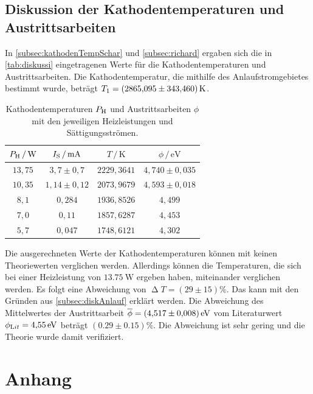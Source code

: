 \subsection{Diskussion der Kathodentemperaturen und Austrittsarbeiten}
\label{subsec:diskTemps}

In \autoref{subsec:kathodenTempSchar} und \autoref{subsec:richard} ergaben sich die in \autoref{tab:diskussi} eingetragenen Werte für die Kathodentemperaturen und Austrittsarbeiten.
Die Kathodentemperatur, die mithilfe des Anlaufstromgebietes bestimmt wurde, beträgt $T_1 = \SI{2865,095 \pm 343,460}{\kelvin}$.
\begin{table}[H]
    \caption{Kathodentemperaturen $P_{\text H}$ und Austrittsarbeiten $\phi$ mit den jeweiligen Heizleistungen und Sättigungsströmen.}
    \label{tab:diskussi}
    \centering
    \begin{tabular}{c c c c}
        \toprule
        $P_{\text H} \,/\, \si{\watt}$ & $I_{\text S} \,/\, \si{\milli\ampere}$ & $T \,/\, \si{\kelvin}$ & $\phi \,/\, \si{\eV}$\\
        \midrule
        $13,75$ & $3,7 \pm 0,7$   & $2229,3641$ & $4,740 \pm 0,035$ \\
        $10,35$ & $1,14 \pm 0,12$ & $2073,9679$ & $4,593 \pm 0,018$ \\
        $8,1$   & $0,284$         & $1936,8526$ & $4,499$ \\
        $7,0$   & $0,11$          & $1857,6287$ & $4,453$ \\
        $5,7$   & $0,047$         & $1748,6121$ & $4,302$ \\
        \bottomrule
      \end{tabular}
  \end{table}

  \noindent
Die ausgerechneten Werte der Kathodentemperaturen können mit keinen Theoriewerten verglichen werden. Allerdings können die Temperaturen, die sich
bei einer Heizleistung von $\SI{13,75}{\watt}$ ergeben haben, miteinander verglichen werden.
Es folgt eine Abweichung von $\upDelta T = (29 \pm 15)\%$. Das kann mit den Gründen aus \autoref{subsec:diskAnlauf} erklärt werden.
Die Abweichung des Mittelwertes der Austrittsarbeit $\overline\phi = \SI{4,517 \pm 0,008}{\eV}$ vom Literaturwert $\phi_{\text Lit} = \SI{4,55}{\eV}$ \cite{AustrittsArbeitWolfram}
beträgt $(0.29 \pm 0.15)\%$.
Die Abweichung ist sehr gering und die Theorie wurde damit verifiziert.

\printbibliography{}

\section*{Anhang}
\label{sec:anhang}

